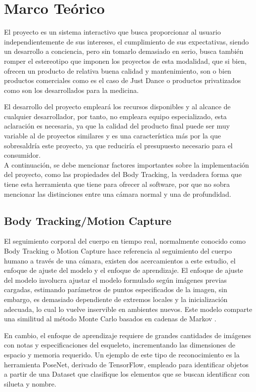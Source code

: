 \chapter{Marco Teórico}


El proyecto es un sistema interactivo que busca proporcionar al usuario independientemente de sus intereses, el cumplimiento de sus expectativas, siendo un desarrollo a conciencia, pero sin tomarlo demasiado en serio, busca también romper el estereotipo que imponen los proyectos de esta modalidad, que si bien, ofrecen un producto de relativa buena calidad y mantenimiento, son o bien productos comerciales como es el caso de Just Dance o productos privatizados como son los desarrollados para la medicina. 

El desarrollo del proyecto empleará los recursos disponibles y al alcance de cualquier desarrollador, por tanto, no empleara equipo especializado, esta aclaración es necesaria, ya que la calidad del producto final puede ser muy variable al de proyectos similares y es una característica más por la que sobresaldría este proyecto, ya que reduciría el presupuesto necesario para el consumidor.\\

A continuación, se debe mencionar factores importantes sobre la implementación del proyecto, como las propiedades del Body Tracking, la verdadera forma que tiene esta herramienta que tiene para ofrecer al software, por que no sobra mencionar las distinciones entre una cámara normal y una de profundidad.


\section{Body Tracking/Motion Capture}

El seguimiento corporal del cuerpo en tiempo real, normalmente conocido como Body Tracking o Motion Capture hace referencia al seguimiento del cuerpo humano a través de una cámara, existen dos acercamientos a este estudio, el enfoque de ajuste del modelo y el enfoque de aprendizaje. El enfoque de ajuste del modelo involucra ajustar el modelo formulado según imágenes previas cargadas, estimando parámetros de puntos especificados de la imagen, sin embargo, es demasiado dependiente de extremos locales y la inicialización adecuada, lo cual lo vuelve inservible en ambientes nuevos. Este modelo comparte una similitud al método Monte Carlo basados en cadenas de Markov \cite{siddiqui2010human}.

En cambio, el enfoque de aprendizaje requiere de grandes cantidades de imágenes con notas y especificaciones del esqueleto, incrementando las dimensiones de espacio y memoria requerido. Un ejemplo de este tipo de reconocimiento es la herramienta PoseNet, derivado de TensorFlow, empleado para identificar objetos a partir de una Dataset que clasifique los elementos que se buscan identificar con silueta y nombre.

